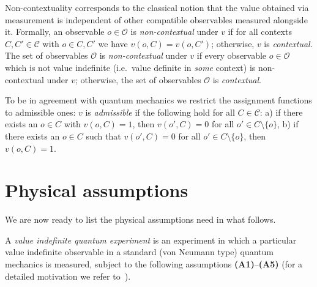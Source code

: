 \documentclass[%
 preprint,
 showpacs,
 showkeys,
 preprintnumbers,
  amsmath,amssymb,
  aps,
 pra,
  longbibliography,
  floatfix,
 ]{revtex4-1}
\theoremstyle{plain}
\begin{document}
Non-contextuality corresponds to the classical notion that the value obtained via measurement is independent of other compatible observables measured alongside it. Formally, an
 observable $o\in \mathcal{O}$ is \emph{non-contextual} under $v$ if for all contexts $C,C' \in \mathcal{C}$ with $o\in C,C'$ we have $v(o,C)=v(o,C')$; otherwise, $v$ is \emph{contextual}.
The set of observables $\mathcal{O}$ is \emph{non-contextual} under $v$ if every observable $o\in\mathcal{O}$ which is not value indefinite (i.e.\ value definite in \emph{some} context) is non-contextual under $v$;
otherwise, the set of observables $\mathcal{O}$ is \emph{contextual}.

\medskip


To be in agreement with quantum mechanics we restrict the assignment functions to admissible ones:   $v$ is  \emph{admissible} if the following hold for all $C \in \mathcal{C}$: a)
if there exists an $o\in C$ with $v(o,C)=1$, then $v(o',C)=0$ for all $o'\in C\setminus\{o\}$, b)
if there exists an $o\in C$ such that $v(o',C)=0$ for all $o'\in C\setminus \{o\}$, then $v(o,C)=1$.


\section{Physical assumptions}
We are now ready to list the physical assumptions need in what follows.

A {\em value indefinite quantum experiment} is an experiment in which a particular  value indefinite observable  in a standard (von Neumann type) quantum mechanics is measured,  subject to the following assumptions {\bf (A1)}--{\bf (A5)} (for a detailed motivation we refer to~\cite{ACCS}).
\end{document}

